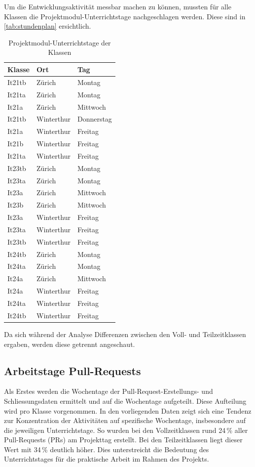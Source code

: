 Um die Entwicklungsaktivität messbar machen zu können, mussten für alle Klassen die Projektmodul-Unterrichtstage nachgeschlagen werden. Diese sind in \autoref{tab:stundenplan} ersichtlich. 
\begin{table}[ht]
\caption{Projektmodul-Unterrichtstage der Klassen}
\label{tab:stundenplan}
\centering
\begin{tabular}{l l l}
\toprule
\textbf{Klasse} & \textbf{Ort} & \textbf{Tag} \\
\midrule
It21tb   & Zürich      & Montag      \\
It21ta   & Zürich      & Montag      \\
It21a    & Zürich      & Mittwoch    \\
It21tb   & Winterthur  & Donnerstag  \\
It21a    & Winterthur  & Freitag     \\
It21b    & Winterthur  & Freitag     \\
It21ta   & Winterthur  & Freitag     \\
\midrule
It23tb   & Zürich      & Montag      \\
It23ta   & Zürich      & Montag      \\
It23a    & Zürich      & Mittwoch    \\
It23b    & Zürich      & Mittwoch    \\
It23a    & Winterthur  & Freitag     \\
It23ta   & Winterthur  & Freitag     \\
It23tb   & Winterthur  & Freitag     \\
\midrule
It24tb   & Zürich      & Montag      \\
It24ta   & Zürich      & Montag      \\
It24a    & Zürich      & Mittwoch    \\
It24a    & Winterthur  & Freitag     \\
It24ta   & Winterthur  & Freitag     \\
It24tb   & Winterthur  & Freitag     \\
\bottomrule
\end{tabular}
\end{table}


Da sich während der Analyse  Differenzen zwischen den Voll- und Teilzeitklassen ergaben, werden diese getrennt angeschaut. 

\subsection{Arbeitstage Pull-Requests}
Als Erstes werden die Wochentage der Pull-Request-Erstellungs- und Schliessungsdaten ermittelt und auf die Wochentage aufgeteilt. Diese Aufteilung wird pro Klasse vorgenommen. In den vorliegenden Daten zeigt sich eine Tendenz zur Konzentration der Aktivitäten auf spezifische Wochentage, insbesondere auf die jeweiligen Unterrichtstage. So wurden bei den Vollzeitklassen rund 24\,\% aller Pull-Requests (PRs) am Projekttag erstellt. Bei den Teilzeitklassen liegt dieser Wert mit 34\,\% deutlich höher. Dies unterstreicht die Bedeutung des Unterrichtstages für die praktische Arbeit im Rahmen des Projekts.

